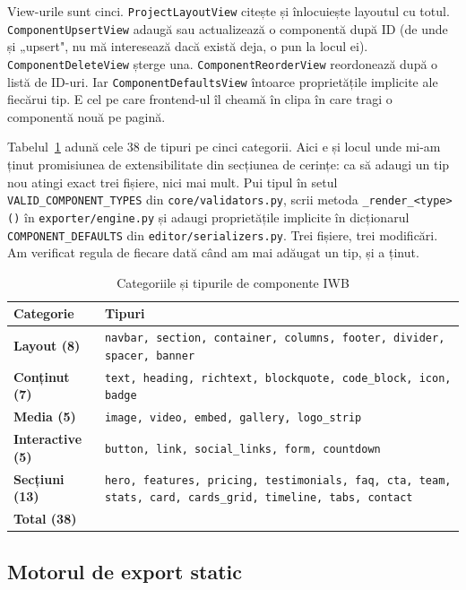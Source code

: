 \documentclass[12pt,a4paper]{report}
\begin{document}
View-urile sunt cinci. \texttt{ProjectLayoutView} citește și înlocuiește layoutul cu
totul. \texttt{ComponentUpsertView} adaugă sau actualizează o componentă după ID
(de unde și „upsert", nu mă interesează dacă există deja, o pun la locul ei).
\texttt{ComponentDeleteView} șterge una. \texttt{ComponentReorderView} reordonează
după o listă de ID-uri. Iar \texttt{ComponentDefaultsView} întoarce proprietățile
implicite ale fiecărui tip. E cel pe care frontend-ul îl cheamă în clipa în care
tragi o componentă nouă pe pagină.

Tabelul~\ref{tab:components} adună cele 38 de tipuri pe cinci categorii. Aici e și
locul unde mi-am ținut promisiunea de extensibilitate din secțiunea de cerințe: ca să
adaugi un tip nou atingi exact trei fișiere, nici mai mult. Pui tipul în setul
\texttt{VALID\_COMPONENT\_TYPES} din \texttt{core/validators.py}, scrii metoda
\texttt{\_render\_<type>()} în \texttt{exporter/engine.py} și adaugi proprietățile
implicite în dicționarul \texttt{COMPONENT\_DEFAULTS} din
\texttt{editor/serializers.py}. Trei fișiere, trei modificări. Am verificat regula
de fiecare dată când am mai adăugat un tip, și a ținut.

\begin{table}[htbp]
  \centering
  \caption{Categoriile și tipurile de componente IWB}
  \label{tab:components}
  \renewcommand{\arraystretch}{1.2}
  \begin{tabularx}{\textwidth}{>{\bfseries}l X}
    \toprule
    Categorie & Tipuri \\
    \midrule
    Layout (8)      & \texttt{navbar, section, container, columns, footer,
                      divider, spacer, banner} \\
    Conținut (7)    & \texttt{text, heading, richtext, blockquote, code\_block,
                      icon, badge} \\
    Media (5)       & \texttt{image, video, embed, gallery, logo\_strip} \\
    Interactive (5) & \texttt{button, link, social\_links, form, countdown} \\
    Secțiuni (13)   & \texttt{hero, features, pricing, testimonials, faq, cta,
                      team, stats, card, cards\_grid, timeline, tabs, contact} \\
    \midrule
    \textbf{Total (38)} & \\
    \bottomrule
  \end{tabularx}
\end{table}

\subsection{Motorul de export static}
\end{document}
